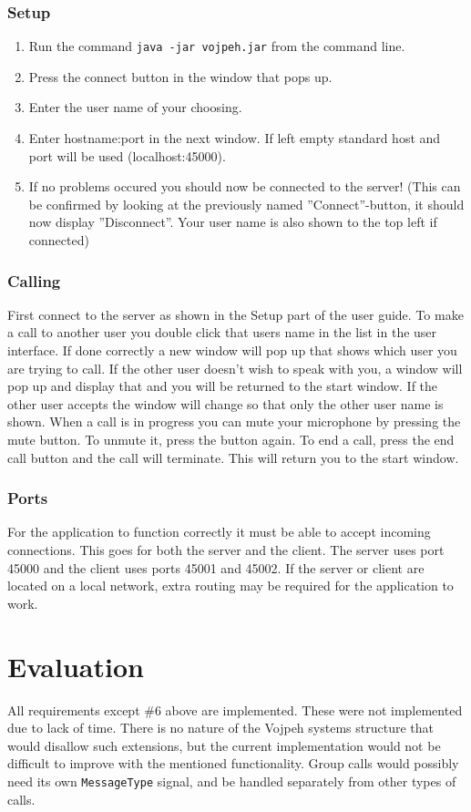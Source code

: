 \documentclass[a4paper,titlepage]{article}
\newcommand{\code}{\texttt}
\begin{document}
\subsubsection*{Setup}
\begin{enumerate}
\item Run the command \code{java -jar vojpeh.jar} from the command line.
\item Press the connect button in the window that pops up.
\item Enter the user name of your choosing.
\item Enter hostname:port in the next window. If left empty standard host and port will be used (localhost:45000).
\item If no problems occured you should now be connected to the server! (This can be confirmed by looking at the previously named ''Connect''-button, it should now display ''Disconnect''. Your user name is also shown to the top left if connected)
\end{enumerate}
\subsubsection*{Calling}
First connect to the server as shown in the Setup part of the user guide. To make a call to another user you double click that users name in the list in the user interface. If done correctly a new window will pop up that shows which user you are trying to call. If the other user doesn’t wish to speak with you, a window will pop up and display that and you will be returned to the start window. If the other user accepts the window will change so that only the other user name is shown. When a call is in progress you can mute your microphone by pressing the mute button. To unmute it, press the button again. To end a call, press the end call button and the call will terminate. This will return you to the start window.
\subsubsection*{Ports}
For the application to function correctly it must be able to accept incoming connections. This goes for both the server and the client. The server uses port 45000 and the client uses ports 45001 and 45002. If the server or client are located on a local network, extra routing may be required for the application to work.

\section{Evaluation}
All requirements except \#6 above are implemented. These were not implemented due to lack of time. There is no nature of the Vojpeh systems structure that would disallow such extensions, but the current implementation would not be difficult to improve with the mentioned functionality. Group calls would possibly need its own \code{MessageType} signal, and be handled separately from other types of calls.
\end{document}
